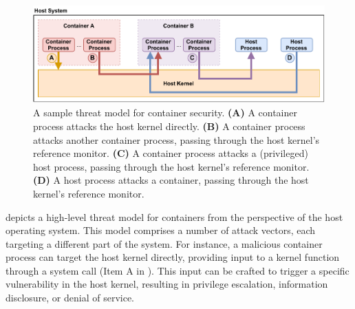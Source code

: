 
\begin{figure}[htbp]
  \centering
  \includegraphics[width=0.8\linewidth]{figs/background/container_security.pdf}
  \caption[A sample threat model for container security]{
    A sample threat model for container security.
    \textbf{(A)} A container process attacks the host kernel directly.
    \textbf{(B)} A container process attacks another container process, passing through the host kernel's reference monitor.
    \textbf{(C)} A container process attacks a (privileged) host process, passing through the host kernel's reference monitor.
    \textbf{(D)} A host process attacks a container, passing through the host kernel's reference monitor.
  }%
  \label{fig:containersec}
\end{figure}

 depicts a high-level threat model for containers from the
perspective of the host operating system.  This model comprises a number of attack
vectors, each targeting a different part of the system. For instance, a malicious
container process can target the host kernel directly, providing input to a kernel
function through a system call (Item A in ). This input can be
crafted to trigger a specific vulnerability in the host kernel, resulting in privilege
escalation, information disclosure, or denial of service.

